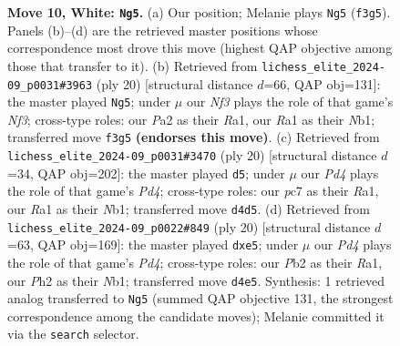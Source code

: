 \documentclass[11pt]{article}
\begin{document}
\begin{figure}[p]
\caption{\textbf{Move 10, White: \texttt{Ng5}.} (a) Our position; Melanie plays \texttt{Ng5} (\texttt{f3g5}). Panels (b)--(d) are the retrieved master positions whose correspondence most drove this move (highest QAP objective among those that transfer to it). (b) Retrieved from \texttt{lichess\_elite\_2024-09\_p0031\#3963} (ply 20) [structural distance $d$=66, QAP obj=131]: the master played \texttt{Ng5}; under $\mu$ our \emph{Nf3} plays the role of that game's \emph{Nf3}; cross-type roles: our \emph{P}a2 as their \emph{R}a1, our \emph{R}a1 as their \emph{N}b1; transferred move \texttt{f3g5} \textbf{(endorses this move)}. (c) Retrieved from \texttt{lichess\_elite\_2024-09\_p0031\#3470} (ply 20) [structural distance $d$=34, QAP obj=202]: the master played \texttt{d5}; under $\mu$ our \emph{Pd4} plays the role of that game's \emph{Pd4}; cross-type roles: our \emph{p}c7 as their \emph{R}a1, our \emph{R}a1 as their \emph{N}b1; transferred move \texttt{d4d5}. (d) Retrieved from \texttt{lichess\_elite\_2024-09\_p0022\#849} (ply 20) [structural distance $d$=63, QAP obj=169]: the master played \texttt{dxe5}; under $\mu$ our \emph{Pd4} plays the role of that game's \emph{Pd4}; cross-type roles: our \emph{P}b2 as their \emph{R}a1, our \emph{P}h2 as their \emph{N}b1; transferred move \texttt{d4e5}. Synthesis: 1 retrieved analog transferred to \texttt{Ng5} (summed QAP objective 131, the strongest correspondence among the candidate moves); Melanie committed it via the \texttt{search} selector.}
\label{fig:thought-m18}
\end{figure}

\clearpage
\end{document}

